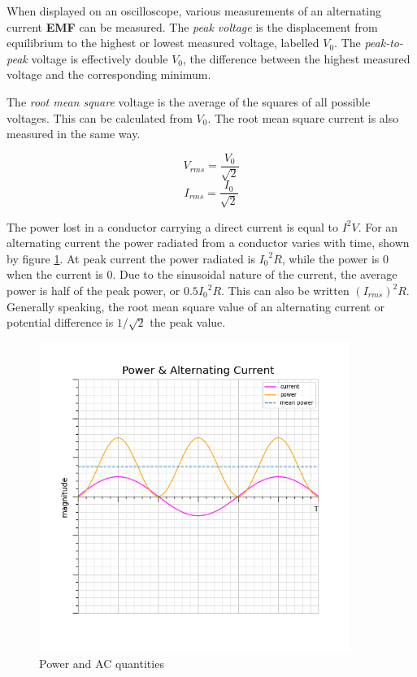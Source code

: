 \documentclass[10pt]{article}
\begin{document}
When displayed on an oscilloscope, various measurements of an alternating current \textbf{EMF} can be measured. The \emph{peak voltage} is the displacement from equilibrium to the highest or lowest measured voltage, labelled \(V_0\). The \emph{peak-to-peak} voltage is effectively double \(V_0\), the difference between the highest measured voltage and the corresponding minimum.

The \emph{root mean square} voltage is the average of the squares of all possible voltages. This can be calculated from \(V_0\). The root mean square current is also measured in the same way.

\begin{figure}[H]
\centering
\begin{minipage}{0.8\textwidth}
\begin{tcolorbox}[
sharp corners=all,
colback=white,
colframe=white,
size=tight,
boxrule=0.2mm,
left=10mm, right=10mm,
]
\begin{multicols}{2}
\noindent
\[V_{rms} = \dfrac{V_0}{\sqrt{2}}\]
\columnbreak
\[I_{rms} = \dfrac{I_0}{\sqrt{2}}\]
\end{multicols}
\end{tcolorbox}
\end{minipage}
\end{figure}

The power lost in a conductor carrying a direct current is equal to \(I^2V\). For an alternating current the power radiated from a conductor varies with time, shown by figure \ref{img:ac_power}. At peak current the power radiated is \({I_0}^2R\), while the power is 0 when the current is 0. Due to the sinusoidal nature of the current, the average power is half of the peak power, or \(0.5 {I_0}^2 R\). This can also be written \((I_{rms})^2R\). Generally speaking, the root mean square value of an alternating current or potential difference is \(1/\sqrt{2}\) the peak value.

\begin{figure}[H]
\centering
\includegraphics[width=0.9\textwidth,keepaspectratio]{./images/ac_power.png}
\caption{Power and AC quantities}
\label{img:ac_power}
\end{figure}
\end{document}
